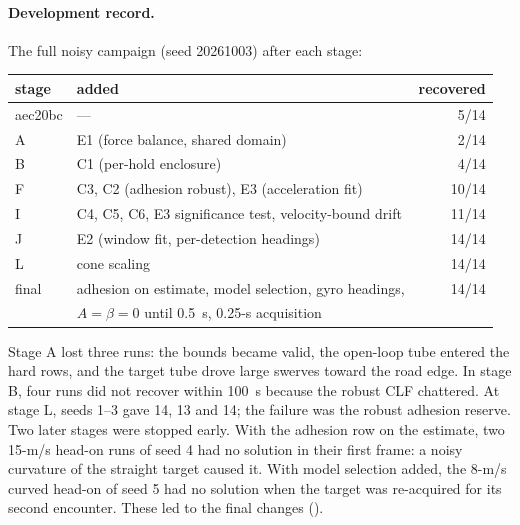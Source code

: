 \documentclass[11pt]{article}
\begin{document}
\paragraph{Development record.} The full noisy campaign (seed 20261003) after
each stage:
\begin{center}
\begin{tabular}{llr}
\toprule
stage & added & recovered\\
\midrule
aec20bc & --- & 5/14\\
A & E1 (force balance, shared domain) & 2/14\\
B & C1 (per-hold enclosure) & 4/14\\
F & C3, C2 (adhesion robust), E3 (acceleration fit) & 10/14\\
I & C4, C5, C6, E3 significance test, velocity-bound drift & 11/14\\
J & E2 (window fit, per-detection headings) & 14/14\\
L & cone scaling & 14/14\\
final & adhesion on estimate, model selection, gyro headings, & 14/14\\
 & $A=\beta=0$ until 0.5~s, 0.25-s acquisition & \\
\bottomrule
\end{tabular}
\end{center}
Stage A lost three runs: the bounds became valid, the open-loop tube entered
the hard rows, and the target tube drove large swerves toward the road
edge. In stage B, four runs did not recover within 100~s because the robust
CLF chattered. At stage L, seeds 1--3 gave 14, 13 and 14; the failure was the
robust adhesion reserve. Two later stages were stopped early. With the adhesion
row on the estimate, two 15-m/s head-on runs of seed 4 had no solution in
their first frame: a noisy curvature of the straight target caused it. With
model selection added, the 8-m/s curved head-on of seed 5 had no solution
when the target was re-acquired for its second encounter. These led to the
final changes ().
\end{document}
